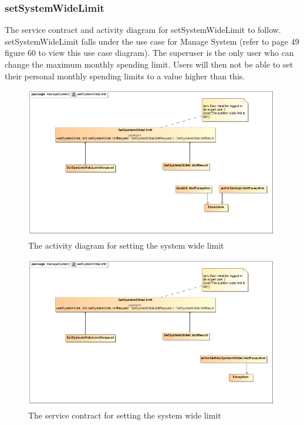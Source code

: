 \documentclass[a4paper,12pt]{report}
\begin{document}
\subsubsection{setSystemWideLimit}
The service contract and activity diagram for setSystemWideLimit to follow. setSystemWideLimit falls under the use case for Manage System (refer to page 49 figure 60 to view this use case diagram). The superuser is the only user who can change the maximum monthly spending limit. Users will then not be able to set their personal monthly spending limits to a value higher than this.
\begin{figure}[H]
  \centering
    \includegraphics[width=1.0\textwidth]{../images/setSystemWideLimit.png}
    \caption{The activity diagram for setting the system wide limit} 
\end{figure}

\begin{figure}[H]
	\centering
	\includegraphics[width=1.0\textwidth]{../images/setSystemWideLimitServiceContract.png}
	\caption{The service contract for setting the system wide limit}
\end{figure}
\end{document}
